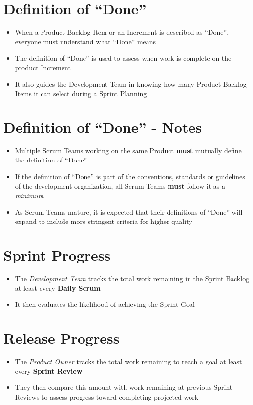 \documentclass[a4paper,11pt,twocolumn]{article}
\begin{document}
\section*{Definition of ``Done''}
\begin{itemize}
	\item When a Product Backlog Item or an Increment is described as ``Done'', everyone must understand what ``Done'' means
	\item The definition of ``Done'' is used to assess when work is complete on the product Increment
    \item It also guides the Development Team in knowing how many Product Backlog Items it can select during a Sprint Planning
\end{itemize}

\section*{Definition of ``Done'' - Notes}
\begin{itemize}
    \item Multiple Scrum Teams working on the same Product \textbf{must} mutually define the definition of ``Done''
    \item If the definition of ``Done'' is part of the conventions, standards or guidelines of the development organization, all Scrum Teams \textbf{must} follow it as a \textit{minimum}
	\item As Scrum Teams mature, it is expected that their definitions of ``Done'' will expand to include more stringent criteria for higher quality
\end{itemize}

\section*{Sprint Progress}
\begin{itemize}
    \item The \textit{Development Team} tracks the total work remaining in the Sprint Backlog at least every \textbf{Daily Scrum}
    \item It then evaluates the likelihood of achieving the Sprint Goal
\end{itemize}

\section*{Release Progress}
\begin{itemize}
    \item The \textit{Product Owner} tracks the total work remaining to reach a goal at least every \textbf{Sprint Review}
    \item They then compare this amount with work remaining at previous Sprint Reviews to assess progress toward completing projected work
\end{itemize}

\nocite{*}


\end{document}
